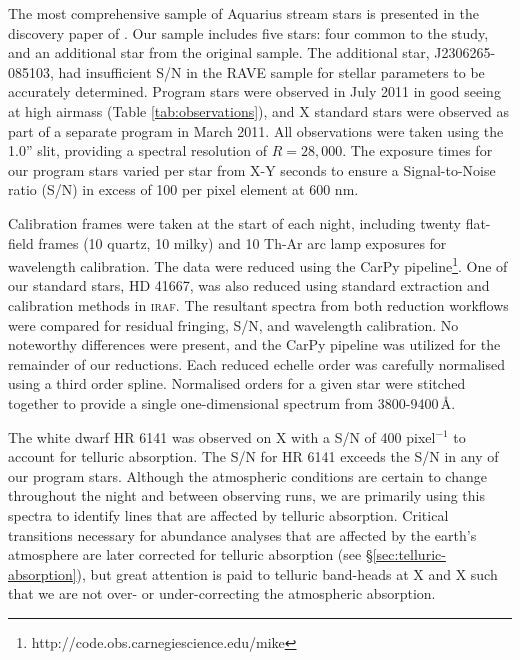\documentclass{emulateapj}
\begin{document}
The most comprehensive sample of Aquarius stream stars is presented in the discovery paper of \citet{williams;et-al_2011}. Our sample includes five stars: four common to the \citet{wylie-de-boer;et-al_2012} study, and an additional star from the original \citet{williams;et-al_2011} sample. The additional star, J2306265-085103, had insufficient S/N in the RAVE sample for stellar parameters to be accurately determined. Program stars were observed in July 2011 in good seeing at high airmass (Table \ref{tab:observations}), and X standard stars were observed as part of a separate program in March 2011. All observations were taken using the 1.0'' slit, providing a spectral resolution of $R = 28,000$. The exposure times for our program stars varied per star from X-Y seconds to ensure a Signal-to-Noise ratio (S/N) in excess of 100 per pixel element at 600 nm.


Calibration frames were taken at the start of each night, including twenty flat-field frames (10 quartz, 10 milky) and 10 Th-Ar arc lamp exposures for wavelength calibration. The data were reduced using the CarPy pipeline\footnote{http://code.obs.carnegiescience.edu/mike}. One of our standard stars, HD 41667, was also reduced using standard extraction and calibration methods in \textsc{iraf}. The resultant spectra from both reduction workflows were compared for residual fringing, S/N, and wavelength calibration. No noteworthy differences were present, and the CarPy pipeline was utilized for the remainder of our reductions. Each reduced echelle order was carefully normalised using a third order spline. Normalised orders  for a given star were stitched together to provide a single one-dimensional spectrum from 3800-9400\,\AA{}. 
 
The white dwarf HR 6141 was observed on X with a S/N of 400 pixel$^{-1}$ to account for telluric absorption. The S/N for HR 6141 exceeds the S/N in any of our program stars. Although the atmospheric conditions are certain to change throughout the night and between observing runs, we are primarily using this spectra to identify lines that are affected by telluric absorption. Critical transitions necessary for abundance analyses that are affected by the earth's atmosphere are later corrected for telluric absorption (see \S\ref{sec:telluric-absorption}), but great attention is paid to telluric band-heads at X and X such that we are not over- or under-correcting the atmospheric absorption.
\end{document}
